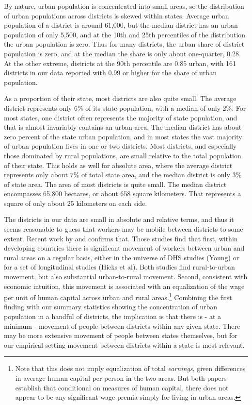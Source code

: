 \documentclass[11pt]{article}
\begin{document}
By nature, urban population is concentrated into small areas, so the distribution of urban populations across districts is skewed within states. Average urban population of a district is around 61,000, but the median district has an urban population of only 5,500, and at the 10th and 25th percentiles of the distribution the urban population is zero. Thus for many districts, the urban share of district population is zero, and at the median the share is only about one-quarter, 0.28. At the other extreme, districts at the 90th percentile are 0.85 urban, with 161 districts in our data reported with 0.99 or higher for the share of urban population. 

As a proportion of their state, most districts are also quite small. The average district represents only 6\% of its state population, with a median of only 2\%. For most states, one district often represents the majority of state population, and that is almost invariably contains an urban area. The median district has about zero percent of the state urban population, and in most states the vast majority of urban population lives in one or two districts. Most districts, and especially those dominated by rural populations, are small relative to the total population of their state. This holds as well for absolute area, where the average district represents only about 7\% of total state area, and the median district is only 3\% of state area. The area of most districts is quite small. The median district encompasses 65,800 hectares, or about 658 square kilometers. That represents a square of only about 25 kilometers on each side. 

The districts in our data are small in absolute and relative terms, and thus it seems reasonable to guess that workers may be mobile between districts to some extent. Recent work by \cite{young2013inequality} and \cite{hklm2017} confirms that. Those studies find that first, within developing countries there is significant movement of workers between urban and rural areas on a regular basis, either in the universe of DHS studies (Young) or for a set of longitudinal studies (Hicks et al). Both studies find rural-to-urban movement, but also substantial urban-to-rural movement. Second, consistent with economic intuition, this movement is associated with an equalization of the wage per unit of human capital across urban and rural areas.\footnote{Note that this does not imply equalization of total \textit{earnings}, given differences in average human capital per person in the two areas. But both papers establish that conditional on measures of human capital, there does not appear to be any significant wage premia simply for living in urban areas.} Combining the first finding with our summary statistics showing the concentration of urban population in a handful of districts, the implication is that there is - at a minimum - movement of people between districts within any given state. There may be more extensive movement of people between states themselves, but for our empirical setting movement between districts within a state is most relevant.
\end{document}
